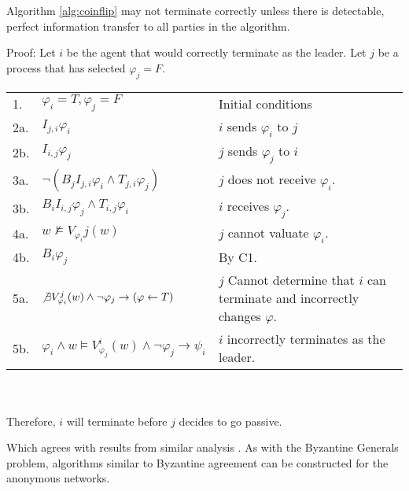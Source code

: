 \begin{thm}
Algorithm \ref{alg:coinflip} may not terminate correctly unless there is detectable, perfect information transfer to all parties in the algorithm.
\end{thm}

Proof: Let $i$ be the agent that would correctly terminate as the leader. Let $j$ be a process that has selected $\varphi_j = F$.

\begin{table}[h!]
\centering
\small
\begin{tabularx}{\linewidth}{l X X}
1. & $\varphi_i = T, \varphi_j = F$ & Initial conditions \\
2a.& $I_{j,i} \varphi_i$ & $i$ sends $\varphi_i$ to $j$ \\
2b.& $I_{i,j} \varphi_j$ & $j$ sends $\varphi_j$ to $i$ \\
3a.& $\neg (B_j I_{j,i} \varphi_i \wedge T_{j,i} \varphi_j)$ & $j$ does not receive $\varphi_i$. \\
3b.& $B_i I_{i,j} \varphi_j \wedge T_{i,j} \varphi_i$ & $i$ receives $\varphi_j$. \\
4a.& $w \not \vDash V_{\varphi_i}{j}(w)$ & $j$ cannot valuate $\varphi_i$. \\
4b.& $B_i \varphi_j$ & By C1. \\
5a. & $\not \exists V_{\varphi_i}^j(w) \wedge \neg \varphi_j \rightarrow (\varphi \gets T)$ & $j$ Cannot determine that $i$ can terminate and incorrectly changes $\varphi$. \\
5b. & $\varphi_i \wedge w \vDash V_{\varphi_j}^i(w) \wedge \neg \varphi_j \rightarrow \psi_i$ & $i$ incorrectly terminates as the leader. \\

\end{tabularx} \\~\\
Therefore, $i$ will terminate before $j$ decides to go passive.
\label{tab:anonymityproof}
\end{table}

Which agrees with results from similar analysis \cite{anon-omission}.
As with the Byzantine Generals problem, algorithms similar to Byzantine agreement can be constructed for the anonymous networks.
